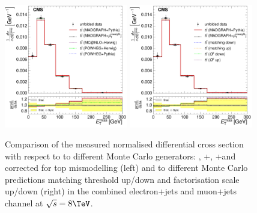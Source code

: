 \begin{figure}[hbtp]
    \centering
     \includegraphics[width=0.48\textwidth]{Chapters/04_Analysis/04b_XSections/images/results/8TeV/MET/central/normalised_xsection_combined_different_generators.pdf}\hfill
     \includegraphics[width=0.48\textwidth]{Chapters/04_Analysis/04b_XSections/images/results/8TeV/MET/central/normalised_xsection_combined_systematics_shifts.pdf}\hfill
     \caption{Comparison of the measured normalised differential cross section with respect to \met to
     different Monte Carlo generators: \MADGRAPH, \POWHEG+\HERWIG, \POWHEG+\PYTHIA and \MADGRAPH corrected for
     top \pt mismodelling (left) and to different Monte Carlo predictions matching threshold up/down and
     factorisation scale up/down (right) in the combined electron+jets and muon+jets channel at
     $\sqrt{s}=8\TeV$.}
     \label{fig:result_MET_8TeV_combined}
\end{figure}

